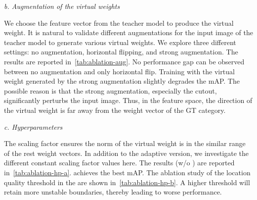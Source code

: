 \documentclass[runningheads]{llncs}
\begin{document}
\vspace{0.5em}\noindent\textit{b. Augmentation of the virtual weights}

\noindent We choose the feature vector from the teacher model to produce the virtual weight. It is natural to validate different augmentations for the input image of the teacher model to generate various virtual weights. We explore three different settings: no augmentation, horizontal flipping, and strong augmentation. The results are reported in~\cref{tab:ablation-aug}. No performance gap can be observed between no augmentation and only horizontal flip. Training with the virtual weight generated by the strong augmentation slightly degrades the mAP. The possible reason is that the strong augmentation, especially the cutout, significantly perturbs the input image. Thus, in the feature space, the direction of the virtual weight is far away from the weight vector of the GT category.

\vspace{0.5em}\noindent\textit{c. Hyperparameters}

\noindent The scaling factor ensures the norm of the virtual weight is in the similar range of the rest weight vectors. In addition to the adaptive version, we investigate the different constant scaling factor values here. The results (w/o ) are reported in~\cref{tab:ablation-hp-a}.  achieves the best mAP. The ablation study of the location quality threshold  in the  are shown in~\cref{tab:ablation-hp-b}. A higher threshold will retain more unstable boundaries, thereby leading to worse performance.

\begin{table}[t]
\centering
\renewcommand\arraystretch{0.9}
\scriptsize
\caption{Ablation study of different hyperparameters. a) SC. is the scaling factor of the virtual weight. b)  is the threshold of the location quality.}
\begin{minipage}[t]{0.4\textwidth}
\end{minipage}
\begin{minipage}[t]{0.4\textwidth}
    \label{tab:ablation-hp}
\end{minipage}
\vspace{-2em}
\end{table}
\end{document}
